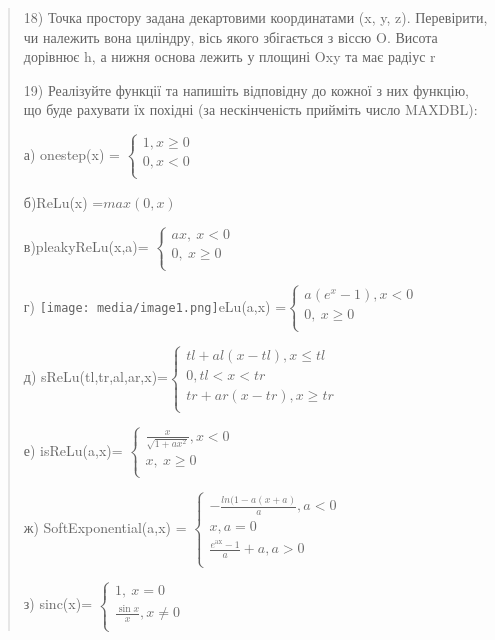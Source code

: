 \documentclass[]{article}
\begin{document}
\begin{quote}
18) Точка простору задана декартовими координатами (x, y, z).
Перевірити, чи належить вона циліндру, вісь якого збігається з віссю O.
Висота дорівнює h, а нижня основа лежить у площині Oxy та має радіус r

19) Реалізуйте функції та напишіть відповідну до кожної з них функцію,
що буде рахувати їх похідні (за нескінченість прийміть число MAXDBL):

а) onestep(x) = \(\left\{ \begin{matrix}
1,x \geq 0 \\
0,x < 0 \\
\end{matrix} \right.\ \)

б)ReLu(x) =\(max(0,x)\)

в)pleakyReLu(x,a)= \(\left\{ \begin{matrix}
ax,\ x < 0 \\
0,\ x \geq 0 \\
\end{matrix} \right.\ \)

г) \texttt{[image: media/image1.png]}eLu(a,x) =\(\left\{ \begin{matrix}
a(e^{x} - 1),x < 0 \\
0,\ x \geq 0 \\
\end{matrix} \right.\ \)

д) sReLu(tl,tr,al,ar,x)=\(\left\{ \begin{matrix}
tl + al\left( x - tl \right),x \leq tl \\
0,tl < x < tr \\
tr + ar\left( x - tr \right),x \geq tr \\
\end{matrix} \right.\ \)

е) isReLu(a,x)= \(\left\{ \begin{matrix}
\frac{x}{\sqrt{1 + ax^{2}}},x < 0 \\
x,\ x \geq 0 \\
\end{matrix} \right.\ \)

ж) SoftExponential(a,x) = \(\left\{ \begin{matrix}
 - \frac{ln(1 - a(x + a)}{a},a < 0 \\
x,a = 0 \\
\frac{e^{\text{ax}} - 1}{a} + a,a > 0 \\
\end{matrix} \right.\ \)

з) sinc(x)= \(\left\{ \begin{matrix}
1,\ x = 0 \\
\frac{\sin x}{x},x \neq 0 \\
\end{matrix} \right.\ \)


\end{quote}
\end{document}
